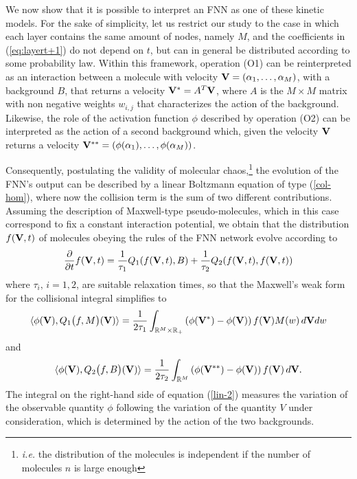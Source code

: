 \documentclass{article}
\newcommand{\fer}[1]{(\ref{#1})}
\newcommand{\R}{\mathbb R}
\def\R{\mathbb{R}}
\def\bV{{\bf V}}
\begin{document}
% 
% 
We now show that it is possible to interpret an FNN as one of these kinetic models.
% 
For the sake of simplicity, let us restrict our study to the case in which each layer contains the same amount of nodes, namely $M$, and the coefficients in \fer{eq:layert+1} do not depend on $t$, but can in general be distributed according to some probability law. 
% 
Within this framework, operation (O1) can be reinterpreted as an interaction between a molecule with velocity $\bV=(\alpha_1,\dots,\alpha_M)$, with a background $B$, that returns a velocity $\bV^* = A^T\bV$, where $A$ is the $M\times M$ matrix with non negative weights $w_{i,j}$ that characterizes the action of the background.
% 
Likewise, the role of the activation function $\phi$ described by operation (O2) can be interpreted as the action of a second background which, given the velocity $\bV$ returns a velocity $\bV^{**} = (\phi(\alpha_1),\dots, \phi(\alpha_M))$.
% 

% 
Consequently, postulating the validity of molecular chaos,\footnote{\textit{i.e.} the distribution of the molecules is independent if the number of molecules $n$ is large enough} the evolution of the FNN's output can be described by a linear Boltzmann equation of type \fer{col-hom}, where now the collision term is the sum of two different contributions. 
% 
Assuming the description of Maxwell-type pseudo-molecules, which in this case correspond to fix a constant interaction potential, we obtain that the distribution $f(\bV,t)$ of molecules obeying  the rules of the FNN network evolve according to
\begin{equation}
    \label{col-FNN}
    \frac\partial{\partial t}f(\bV,t) = \frac 1{\tau_1} Q_1 (f(\bV,t), B)+ \frac 1{\tau_2} Q_2 (f(\bV,t),f(\bV,t))
\end{equation}
where $\tau_i, \, i=1,2$, are suitable relaxation times, so that the Maxwell’s weak form for the collisional integral simplifies to 
\begin{equation}
    \label{lin-1}
    \langle \phi(\bV), Q_1\bigl(f,M\bigr)(\bV)\rangle =  \frac 1{2\tau_1} \int_{{\R}^M\times\R_+} \left(\phi(\bV^*) - \phi(\bV)\right)f( \bV)M( w)\, d\bV d w 
\end{equation}
and
\begin{equation}
    \label{lin-2}
    \langle \phi(\bV), Q_2\bigl(f,B\bigr)(\bV)\rangle = \frac 1{2\tau_2} \int_{{\R}^M} \left(\phi(\bV^{**}) - \phi(\bV)\right)f( \bV)\, d\bV.
\end{equation}
% 
The integral on the right-hand side of equation \fer{lin-2} measures the variation of the observable quantity $\phi$ following the variation of the quantity $V$ under consideration, which is determined by the action of the two backgrounds.
% 
\end{document}
